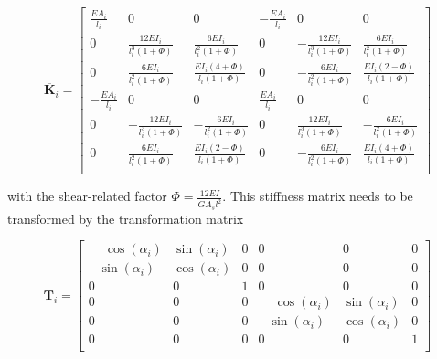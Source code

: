 \begin{equation}
\renewcommand\arraystretch{1.5}
\overline{\boldsymbol{K}}_i = \begin{bmatrix}
 \frac{EA_i}{l_i} &                           0 &                                0 & -\frac{EA_i}{l_i} &                           0 &                                0 \\
            0 &  \frac{12EI_i}{l_i^3(1 + \Phi)} &        \frac{6EI_i}{l_i^2(1 + \Phi)} &             0 & -\frac{12EI_i}{l_i^3(1 + \Phi)} &        \frac{6EI_i}{l_i^2(1 + \Phi)} \\
            0 &   \frac{6EI_i}{l_i^2(1 + \Phi)} & \frac{EI_i(4 + \Phi)}{l_i(1 + \Phi)} &             0 &  -\frac{6EI_i}{l_i^2(1 + \Phi)} & \frac{EI_i(2 - \Phi)}{l_i(1 + \Phi)} \\
-\frac{EA_i}{l_i} &                           0 &                                0 &  \frac{EA_i}{l_i} &                           0 &                                0 \\
            0 & -\frac{12EI_i}{l_i^3(1 + \Phi)} &       -\frac{6EI_i}{l_i^2(1 + \Phi)} &             0 &  \frac{12EI_i}{l_i^3(1 + \Phi)} &       -\frac{6EI_i}{l_i^2(1 + \Phi)} \\
            0 &   \frac{6EI_i}{l_i^2(1 + \Phi)} & \frac{EI_i(2 - \Phi)}{l_i(1 + \Phi)} &             0 &  -\frac{6EI_i}{l_i^2(1 + \Phi)} & \frac{EI_i(4 + \Phi)}{l_i(1 + \Phi)} \\
\end{bmatrix}
\end{equation}

with the shear-related factor $\Phi = \frac{12EI}{GA_s l^2}$.
This stiffness matrix needs to be transformed by the transformation matrix

\begin{equation}
\renewcommand\arraystretch{1.5}
\boldsymbol{T}_i = \begin{bmatrix}
\phantom{-}\cos(\alpha_i) & \sin(\alpha_i) & 0 & 0 & 0 & 0 \\
          -\sin(\alpha_i) & \cos(\alpha_i) & 0 & 0 & 0 & 0 \\
                      0 &            0 & 1 & 0 & 0 & 0 \\
0 & 0 & 0 & \phantom{-}\cos(\alpha_i) & \sin(\alpha_i) & 0 \\
0 & 0 & 0 &           -\sin(\alpha_i) & \cos(\alpha_i) & 0 \\
0 & 0 & 0 &                       0 &            0 & 1 \\
\end{bmatrix}
\end{equation}

